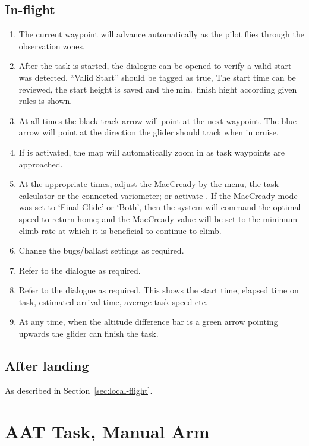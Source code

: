 \subsection*{In-flight}
\begin{enumerate}
\item  The current waypoint will advance automatically as the pilot flies
  through the observation zones.  
\item  After the task is started, the  dialogue can be opened to
  verify a valid start was detected.  ``Valid Start'' should be tagged as true,
  The start time can be reviewed, the start height is saved and the min.\ finish
  hight according given rules is shown.
\item  At all times the black track arrow will point at the next waypoint.  The
  blue arrow will point at the direction the glider should track when in cruise.
\item  If  is activated, the map will automatically zoom in as
  task waypoints are approached.
\item  At the appropriate times, adjust the MacCready by the menu,
  the task calculator or the connected variometer; or activate .
  If the MacCready mode was set to `Final Glide' or `Both', then the system will 
  command the optimal speed to return home; and the MacCready value will be set 
  to the minimum climb rate at which it is beneficial to continue to climb.
\item  Change the bugs/ballast settings as required.
\item  Refer to the  dialogue as required. 
\item  Refer to the  dialogue as required.  This shows the start
  time, elapsed time on task, estimated arrival time, average task speed etc.
\item  At any time, when the altitude difference bar is a green arrow pointing 
  upwards the glider can finish the task.

\end{enumerate}

\subsection*{After landing}
As described in Section~\ref{sec:local-flight}.


\section{AAT Task, Manual Arm}\label{sec:aat-task-manual}

